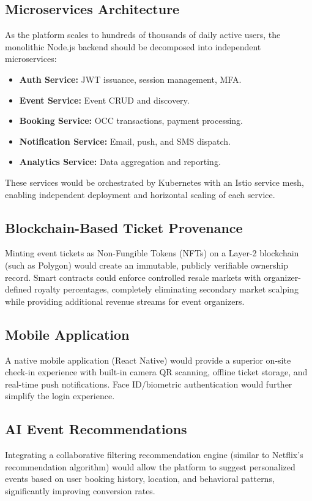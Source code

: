 \documentclass[12pt,a4paper]{report}
\begin{document}
\subsection{Microservices Architecture}
As the platform scales to hundreds of thousands of daily active users, the monolithic Node.js backend should be decomposed into independent microservices:
\begin{itemize}[leftmargin=2em]
    \item \textbf{Auth Service:} JWT issuance, session management, MFA.
    \item \textbf{Event Service:} Event CRUD and discovery.
    \item \textbf{Booking Service:} OCC transactions, payment processing.
    \item \textbf{Notification Service:} Email, push, and SMS dispatch.
    \item \textbf{Analytics Service:} Data aggregation and reporting.
\end{itemize}
These services would be orchestrated by Kubernetes with an Istio service mesh, enabling independent deployment and horizontal scaling of each service.

\subsection{Blockchain-Based Ticket Provenance}
Minting event tickets as Non-Fungible Tokens (NFTs) on a Layer-2 blockchain (such as Polygon) would create an immutable, publicly verifiable ownership record. Smart contracts could enforce controlled resale markets with organizer-defined royalty percentages, completely eliminating secondary market scalping while providing additional revenue streams for event organizers.

\subsection{Mobile Application}
A native mobile application (React Native) would provide a superior on-site check-in experience with built-in camera QR scanning, offline ticket storage, and real-time push notifications. Face ID/biometric authentication would further simplify the login experience.

\subsection{AI Event Recommendations}
Integrating a collaborative filtering recommendation engine (similar to Netflix's recommendation algorithm) would allow the platform to suggest personalized events based on user booking history, location, and behavioral patterns, significantly improving conversion rates.
\end{document}
